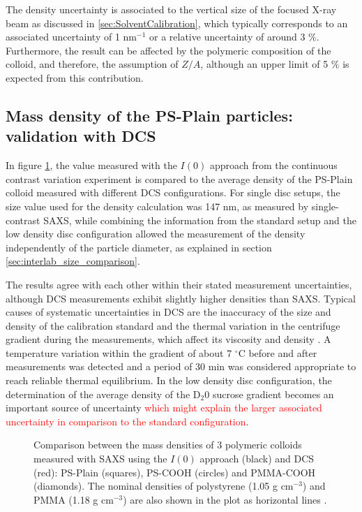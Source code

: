 The density uncertainty is associated to the vertical size of the focused X-ray beam as discussed in \ref{sec:SolventCalibration}, which typically corresponds to an associated uncertainty of 1 nm$^{-1}$ or a relative uncertainty of around 3 $\%$. Furthermore, the result can be affected by the polymeric composition of the colloid, and therefore, the assumption of $Z/A$, although an upper limit of 5 $\%$ is expected from this contribution.

\subsection{Mass density of the PS-Plain particles: validation with DCS}

In figure \ref{fig:DensityComparison}, the value measured with the $I(0)$ approach from the continuous contrast variation experiment is compared to the average density of the PS-Plain colloid measured with different DCS configurations. For single disc setups, the size value used for the density calculation was 147 nm, as measured by single-contrast SAXS, while combining the information from the standard setup and the low density disc configuration allowed the measurement of the density independently of the particle diameter, as explained in section \ref{sec:interlab_size_comparison}.

The results agree with each other within their stated measurement uncertainties, although DCS measurements exhibit slightly higher densities than SAXS. Typical causes of systematic uncertainties in DCS are the inaccuracy of the size and density of the calibration standard and the thermal variation in the centrifuge gradient during the measurements, which affect its viscosity and density \citep{kamiti_simultaneous_2012}. A temperature variation within the gradient of about 7 $^{\circ}$C before and after measurements was detected and a period of 30 min was considered appropriate to reach reliable thermal equilibrium. In the low density disc configuration, the determination of the average density of the D$_2$0 sucrose gradient becomes an important source of uncertainty \textcolor{red}{which might explain the larger associated uncertainty in comparison to the standard configuration}.
\begin{figure}
	\begin{center}
		
	\end{center}
	\caption[Mass densities of 3 polymeric colloids measured with SAXS and DCS.]{Comparison between the mass densities of 3 polymeric colloids measured with SAXS using the $I(0)$ approach (black) and DCS (red): PS-Plain (squares), PS-COOH (circles) and PMMA-COOH (diamonds). The nominal densities of polystyrene (1.05 g cm$^{-3}$) and PMMA (1.18 g cm$^{-3}$) are also shown in the plot as horizontal lines \citep{dingenouts_analysis_1999}.}
	\label{fig:DensityComparison}
\end{figure}

